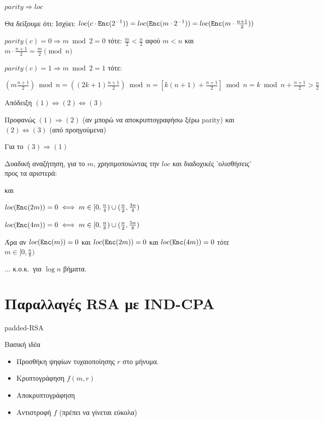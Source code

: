 \documentclass[handout]{beamer}
\begin{document}
\begin{frame}{$parity \Rightarrow loc$}

Θα δείξουμε ότι:  \pause
Ισχύει: $loc( c \cdot \mathtt{Enc}(2^{-1})) = loc(\mathtt{Enc}(m \cdot 2^{-1}))  = loc(\mathtt{Enc}(m \cdot \frac{n+1}{2}))$ 

\medskip \pause
$parity(c) = 0 \Rightarrow m \bmod 2 =0$  τότε:
$ \frac{m}{2}   < \frac{n}{2} $ αφού $m<n$ και $m \cdot \frac{n+1}{2} = \frac{m}{2}  \pmod{n}  $

\medskip \pause
$parity(c) = 1 \Rightarrow m \bmod 2 =1$  τότε:

$(m \frac{n+1}{2}) \bmod n  = ( (2 k +1) \frac{n+1}{2}) \bmod n  =  [k (n+1) + \frac{n+1}{2}] \bmod n 
= k \bmod n + \frac{n+1}{2} > \frac{n}{2}$
 
\end{frame}
\begin{frame}{Απόδειξη $(1) \Leftrightarrow (2) \Leftrightarrow (3)$}

Προφανώς $(1) \Rightarrow (2)$ (αν μπορώ να αποκρυπτογραφήσω ξέρω parity) και $(2) \Leftrightarrow (3)$ (από προηγούμενα)

Για το $(3) \Rightarrow (1)$

Δυαδική αναζήτηση, για το $m$, χρησιμοποιώντας την $loc$ και διαδοχικές 'ολισθήσεις' προς τα αριστερά:

\magenta{$loc(\enc(m)) = 0 \iff m \in [0, \frac{n}{2})$} και 

$loc(\mathtt{Enc}(2m)) = 0 \iff m \in [0, \frac{n}{4}) \cup (\frac{n}{2}, \frac{3n}{4})$ 

$loc(\mathtt{Enc}(4m)) = 0 \iff m \in [0, \frac{n}{8}) \cup (\frac{n}{2}, \frac{5n}{8}) $ 

Άρα αν $loc(\mathtt{Enc}(m)) = 0$ και $loc(\mathtt{Enc}(2m)) = 0$ και $loc(\mathtt{Enc}(4m)) = 0$ τότε $m \in [0, \frac{n}{8})$

$\ldots$ κ.ο.κ.\ για $\log n$ βήματα. 

\end{frame}

\section{Παραλλαγές RSA με IND-CPA}

\begin{frame}{padded-RSA}

\begin{block}{Βασική ιδέα}
\begin{itemize}
    \item Προσθήκη ψηφίων τυχαιοποίησης $r$ στο μήνυμα. \pause
    \item Κρυπτογράφηση $f(m,r)$ \pause
    \item Αποκρυπτογράφηση \pause
    \item Αντιστροφή $f$ (πρέπει να γίνεται εύκολα) 
\end{itemize}
\end{block}
\end{frame}
\end{document}
